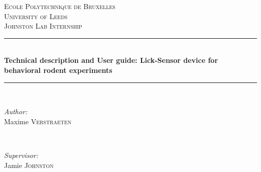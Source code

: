 \documentclass[a4paper]{article}
\begin{document}
\begin{titlepage}

\newcommand{\HRule}{\rule{\linewidth}{0.5mm}} %

\center %
 

\textsc{\LARGE Ecole Polytechnique de Bruxelles}\\[1.5cm] %
\textsc{\LARGE University of Leeds}\\[1.5cm]
\textsc{\large Johnston Lab Internship}\\[0.5cm] %


\HRule \\[0.4cm]
{ \huge \bfseries Technical description and User guide: Lick-Sensor device for behavioral rodent experiments}\\[0.4cm] %
\HRule \\[1.5cm]
 

\begin{minipage}{0.4\textwidth}
\begin{flushleft} \large
\emph{Author:}\\
Maxime \textsc{Verstraeten} %
\end{flushleft}
\end{minipage}
~
\begin{minipage}{0.4\textwidth}
\begin{flushright} \large
\emph{Supervisor:} \\
Jamie \textsc{Johnston}\\[0.3cm] %
\end{flushright}
\end{minipage}\\[2cm]


\end{titlepage}
\end{document}
